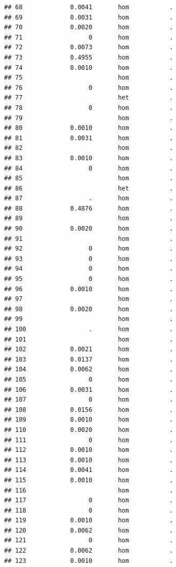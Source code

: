\documentclass[
]{article}
\begin{document}
\begin{verbatim}
## 68             0.0041       hom           .
## 69             0.0031       hom           .
## 70             0.0020       hom           .
## 71                  0       hom           .
## 72             0.0073       hom           .
## 73             0.4955       hom           .
## 74             0.0010       hom           .
## 75                          hom           .
## 76                  0       hom           .
## 77                          het           .
## 78                  0       hom           .
## 79                          hom           .
## 80             0.0010       hom           .
## 81             0.0031       hom           .
## 82                          hom           .
## 83             0.0010       hom           .
## 84                  0       hom           .
## 85                          hom           .
## 86                          het           .
## 87                  .       hom           .
## 88             0.4876       hom           .
## 89                          hom           .
## 90             0.0020       hom           .
## 91                          hom           .
## 92                  0       hom           .
## 93                  0       hom           .
## 94                  0       hom           .
## 95                  0       hom           .
## 96             0.0010       hom           .
## 97                          hom           .
## 98             0.0020       hom           .
## 99                          hom           .
## 100                 .       hom           .
## 101                         hom           .
## 102            0.0021       hom           .
## 103            0.0137       hom           .
## 104            0.0062       hom           .
## 105                 0       hom           .
## 106            0.0031       hom           .
## 107                 0       hom           .
## 108            0.0156       hom           .
## 109            0.0010       hom           .
## 110            0.0020       hom           .
## 111                 0       hom           .
## 112            0.0010       hom           .
## 113            0.0010       hom           .
## 114            0.0041       hom           .
## 115            0.0010       hom           .
## 116                         hom           .
## 117                 0       hom           .
## 118                 0       hom           .
## 119            0.0010       hom           .
## 120            0.0062       hom           .
## 121                 0       hom           .
## 122            0.0062       hom           .
## 123            0.0010       hom           .

\end{verbatim}
\end{document}
